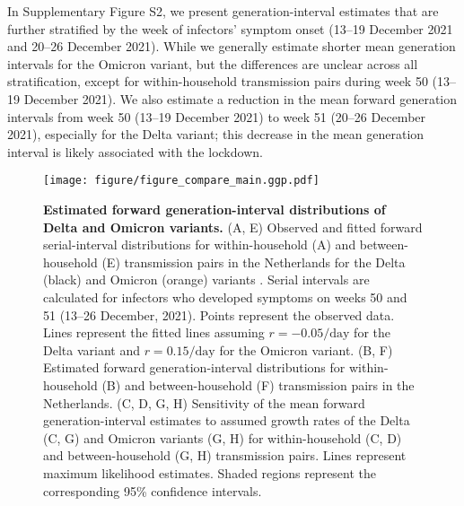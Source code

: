 \documentclass[12pt]{article}
\begin{document}
In Supplementary Figure S2, we present generation-interval estimates that are further stratified by the week of infectors' symptom onset (13--19 December 2021 and 20--26 December 2021).
While we generally estimate shorter mean generation intervals for the Omicron variant, but the differences are unclear across all stratification, except for within-household transmission pairs during week 50 (13--19 December 2021).
We also estimate a reduction in the mean forward generation intervals from week 50 (13--19 December 2021) to week 51 (20--26 December 2021), especially for the Delta variant;
this decrease in the mean generation interval is likely associated with the lockdown.

\begin{figure}[!th]
\texttt{[image: figure/figure\_compare\_main.ggp.pdf]}
\caption{
\textbf{Estimated forward generation-interval distributions of Delta and Omicron variants.}
(A, E) Observed and fitted forward serial-interval distributions for within-household (A) and between-household (E) transmission pairs in the Netherlands for the Delta (black) and Omicron (orange) variants \citep{backer2021omicron}.
Serial intervals are calculated for infectors who developed symptoms on weeks 50 and 51 (13--26 December, 2021).
Points represent the observed data.
Lines represent the fitted lines assuming $r=-0.05/\textrm{day}$ for the Delta variant and $r=0.15/\textrm{day}$ for the Omicron variant.
(B, F) Estimated forward generation-interval distributions for within-household (B) and between-household (F) transmission pairs in the Netherlands.
(C, D, G, H) Sensitivity of the mean forward generation-interval estimates to assumed growth rates of the Delta (C, G) and Omicron variants (G, H) for within-household (C, D) and between-household (G, H) transmission pairs.
Lines represent maximum likelihood estimates.
Shaded regions represent the corresponding 95\% confidence intervals.
\label{fig:serial}
}
\end{figure}
\end{document}
